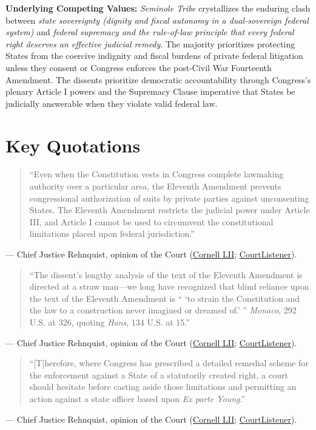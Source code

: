 \documentclass[12pt]{article}
\begin{document}
\textbf{Underlying Competing Values:} \textit{Seminole Tribe} crystallizes the enduring clash between \textit{state sovereignty (dignity and fiscal autonomy in a dual-sovereign federal system)} and \textit{federal supremacy and the rule-of-law principle that every federal right deserves an effective judicial remedy}. The majority prioritizes protecting States from the coercive indignity and fiscal burdens of private federal litigation unless they consent or Congress enforces the post-Civil War Fourteenth Amendment. The dissents prioritize democratic accountability through Congress's plenary Article I powers and the Supremacy Clause imperative that States be judicially answerable when they violate valid federal law.

\section{Key Quotations}

\begin{quote}
``Even when the Constitution vests in Congress complete lawmaking authority over a particular area, the Eleventh Amendment prevents congressional authorization of suits by private parties against unconsenting States. The Eleventh Amendment restricts the judicial power under Article III, and Article I cannot be used to circumvent the constitutional limitations placed upon federal jurisdiction.''
\end{quote}
\noindent --- Chief Justice Rehnquist, opinion of the Court (\href{https://www.law.cornell.edu/supct/html/94-12.ZO.html}{Cornell LII}; \href{https://www.courtlistener.com/opinion/118011/seminole-tribe-of-florida-v-florida/}{CourtListener}).

\begin{quote}
``The dissent's lengthy analysis of the text of the Eleventh Amendment is directed at a straw man---we long have recognized that blind reliance upon the text of the Eleventh Amendment is `` `to strain the Constitution and the law to a construction never imagined or dreamed of.' '' \textit{Monaco}, 292 U.S. at 326, quoting \textit{Hans}, 134 U.S. at 15.''
\end{quote}
\noindent --- Chief Justice Rehnquist, opinion of the Court (\href{https://www.law.cornell.edu/supct/html/94-12.ZO.html}{Cornell LII}; \href{https://www.courtlistener.com/opinion/118011/seminole-tribe-of-florida-v-florida/}{CourtListener}).

\begin{quote}
``[T]herefore, where Congress has prescribed a detailed remedial scheme for the enforcement against a State of a statutorily created right, a court should hesitate before casting aside those limitations and permitting an action against a state officer based upon \textit{Ex parte Young}.''
\end{quote}
\noindent --- Chief Justice Rehnquist, opinion of the Court (\href{https://www.law.cornell.edu/supct/html/94-12.ZO.html}{Cornell LII}; \href{https://www.courtlistener.com/opinion/118011/seminole-tribe-of-florida-v-florida/}{CourtListener}).
\end{document}

